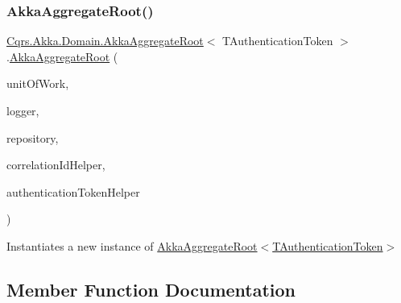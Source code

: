 \subsubsection{\texorpdfstring{Akka\+Aggregate\+Root()}{AkkaAggregateRoot()}}
{\footnotesize\ttfamily \hyperlink{classCqrs_1_1Akka_1_1Domain_1_1AkkaAggregateRoot}{Cqrs.\+Akka.\+Domain.\+Akka\+Aggregate\+Root}$<$ T\+Authentication\+Token $>$.\hyperlink{classCqrs_1_1Akka_1_1Domain_1_1AkkaAggregateRoot}{Akka\+Aggregate\+Root} (\begin{DoxyParamCaption}\item[{\hyperlink{interfaceCqrs_1_1Domain_1_1IUnitOfWork}{I\+Unit\+Of\+Work}$<$ T\+Authentication\+Token $>$}]{unit\+Of\+Work,  }\item[{I\+Logger}]{logger,  }\item[{\hyperlink{interfaceCqrs_1_1Akka_1_1Domain_1_1IAkkaAggregateRepository}{I\+Akka\+Aggregate\+Repository}$<$ T\+Authentication\+Token $>$}]{repository,  }\item[{I\+Correlation\+Id\+Helper}]{correlation\+Id\+Helper,  }\item[{\hyperlink{interfaceCqrs_1_1Authentication_1_1IAuthenticationTokenHelper}{I\+Authentication\+Token\+Helper}$<$ T\+Authentication\+Token $>$}]{authentication\+Token\+Helper }\end{DoxyParamCaption})\hspace{0.3cm}{\ttfamily [protected]}}



Instantiates a new instance of \hyperlink{classCqrs_1_1Akka_1_1Domain_1_1AkkaAggregateRoot_a060f981e4c3023aec36e7c6f1cfb3a9d_a060f981e4c3023aec36e7c6f1cfb3a9d}{Akka\+Aggregate\+Root$<$\+T\+Authentication\+Token$>$} 



\subsection{Member Function Documentation}
\mbox{\label{classCqrs_1_1Akka_1_1Domain_1_1AkkaAggregateRoot_aaa135cb26be9e5353986f5611f05c059_aaa135cb26be9e5353986f5611f05c059}} 
